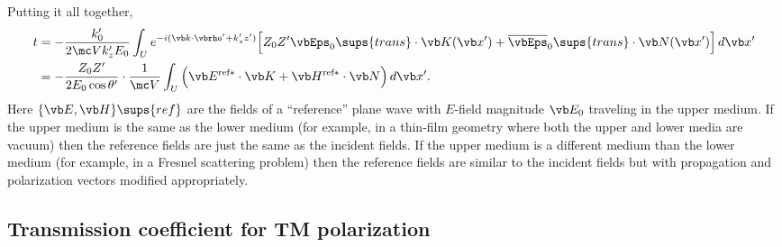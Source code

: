 \documentclass[letterpaper]{article}
\begin{document}
Putting it all together, 
\begin{align}
 t
&=-\frac{k_0^\prime}{2\mc V k_z^\prime E_0}
   \int_U e^{-i(\vb k \cdot \vbrho^\prime + k_z^\prime z^\prime)}
        \Big[ Z_0 Z^\prime \vbEps_0\sups{trans} \cdot \vb K(\vb x^\prime)
                +\overline{\vbEps}_0\sups{trans} \cdot \vb N(\vb x^\prime)
        \Big] \, d\vb x^\prime
\\
&=-\frac{Z_0 Z^\prime}{2E_0 \cos \theta^\prime}
   \cdot \frac{1}{\mc V}
   \int_U \Big(  \vb E^{\text{\scriptsize{ref}}*}\cdot \vb K
                +\vb H^{\text{\scriptsize{ref}}*}\cdot \vb N
          \Big) \, d\vb x^\prime.
\label{TFromKN}
\end{align}
Here $\{\vb E,\vb H\}\sups{ref}$ are the fields of a 
``reference'' plane wave with $E$-field magnitude $\vb E_0$
traveling in the upper medium. If the upper medium is the
same as the lower medium (for example, in a thin-film geometry
where both the upper and lower media are vacuum) then
the reference fields are just the same as the incident
fields. 
If the upper medium is a different medium than the lower medium
(for example, in a Fresnel scattering problem) then the 
reference fields are similar to the incident fields
but with propagation and polarization vectors modified 
appropriately.


\subsection*{Transmission coefficient for TM polarization}
\end{document}
